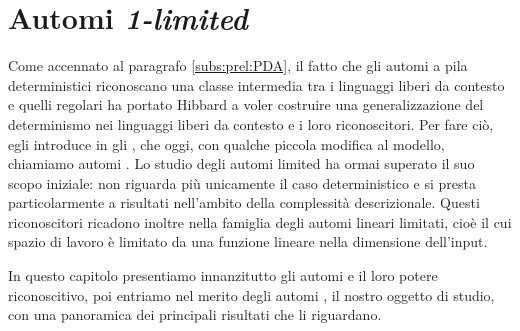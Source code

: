 \chapter{Automi \emph{1-limited}}
Come accennato al paragrafo \ref{subs:prel:PDA}, il fatto che gli automi a pila deterministici riconoscano una classe intermedia tra i linguaggi liberi da contesto e quelli regolari ha portato Hibbard a voler costruire una generalizzazione del determinismo nei linguaggi liberi da contesto e i loro riconoscitori. Per fare ciò, egli introduce in \cite{Hibbard:67:CFdet} gli , che oggi, con qualche piccola modifica al modello, chiamiamo automi . Lo studio degli automi limited ha ormai superato il suo scopo iniziale: non riguarda più unicamente il caso deterministico e si presta particolarmente a risultati nell'ambito della complessità descrizionale. Questi riconoscitori ricadono inoltre nella famiglia degli automi lineari limitati, cioè il cui spazio di lavoro è limitato da una funzione lineare nella dimensione dell'input.

In questo capitolo presentiamo innanzitutto gli automi  e il loro potere riconoscitivo, poi entriamo nel merito degli automi , il nostro oggetto di studio, con una panoramica dei principali risultati che li riguardano.




